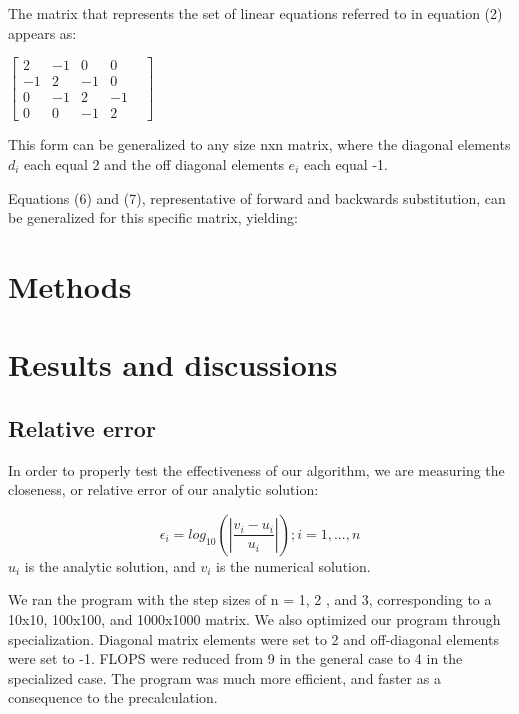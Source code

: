 \documentclass[10pt,showpacs,preprintnumbers,footinbib,amsmath,amssymb,aps,prl,twocolumn,groupedaddress,superscriptaddress,showkeys]{revtex4-1}
\begin{document}
The matrix that represents the set of linear equations referred to in equation (2) appears as:
\begin{center}
		$\begin{bmatrix}
			2 & -1 & 0 & 0 \\
			-1 & 2 & -1 & 0 & \\
			0 & -1 & 2 & -1   \\
			0 & 0 & -1 & 2 
		\end{bmatrix}$
		 
		\end{center}
This form can be generalized to any size nxn matrix, where the diagonal elements $d_{i}$ each equal 2 and the off diagonal elements $e_{i}$ each equal -1.

Equations (6) and (7), representative of forward and backwards substitution, can be generalized for this specific matrix, yielding:


\section{Methods}


\section{Results and discussions}

	\subsection{Relative error}

In order to properly test the effectiveness of our algorithm, we are measuring the closeness, or relative error of our analytic solution:

	\begin{equation}
	\epsilon_{i} = log_{10}(|\frac{v_{i}-u_{i}}{u_{i}}|)  ; i = 1,...,n
	\label{error}
	\end{equation}
$u_{i}$ is the analytic solution, and $v_{i}$ is the numerical solution.

 We ran the program with the step sizes of n = 1, 2 , and 3, corresponding to a 10x10, 100x100, and 1000x1000 matrix. We also optimized our program through specialization. Diagonal matrix elements were set to 2 and off-diagonal elements were set to -1. FLOPS were reduced from 9 in the general case to 4 in the specialized case. The program was much more efficient, and faster as a consequence to the precalculation. 
\end{document}
